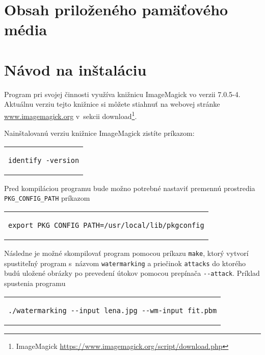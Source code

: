 
\chapter{Obsah priloženého pamäťového média}

\chapter{Návod na inštaláciu}
Program pri svojej činnosti využíva knižnicu ImageMagick vo verzii 7.0.5-4. Aktuálnu verziu tejto knižnice si môžete stiahnuť na webovej stránke \url{www.imagemagick.org} v~sekcii download\footnote{ImageMagick \url{https://www.imagemagick.org/script/download.php}}.

Nainštalovanú verziu knižnice ImageMagick zistíte príkazom:
\begin{center}
\begin{tabular}{c}
\begin{lstlisting}
identify -version
\end{lstlisting}
\end{tabular}
\end{center}

Pred kompiláciou programu bude možno potrebné nastaviť premennú prostredia\\ \verb|PKG_CONFIG_PATH| príkazom
\begin{center}
\begin{tabular}{c}
\begin{lstlisting}
export PKG_CONFIG_PATH=/usr/local/lib/pkgconfig
\end{lstlisting}
\end{tabular}
\end{center}

Následne je možné skompilovať program pomocou príkazu {\tt make}, ktorý vytvorí spustiteľný program s~názvom {\tt watermarking} a priečinok {\tt attacks} do ktorého budú uložené obrázky po prevedení útokov pomocou prepínača \verb|--attack|. Príklad spustenia programu
\begin{center}
\begin{tabular}{c}
\begin{lstlisting}
./watermarking --input lena.jpg --wm-input fit.pbm
\end{lstlisting}
\end{tabular}
\end{center}
